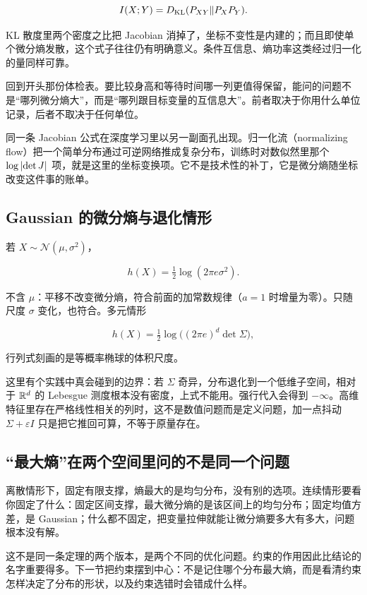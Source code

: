 \[
I(X;Y)=D_{\mathrm{KL}}(P_{XY}\Vert P_XP_Y).
\]

KL 散度里两个密度之比把 Jacobian 消掉了，坐标不变性是内建的；而且即使单个微分熵发散，这个式子往往仍有明确意义。条件互信息、熵功率这类经过归一化的量同样可靠。

回到开头那份体检表。要比较身高和等待时间哪一列更值得保留，能问的问题不是``哪列微分熵大''，而是``哪列跟目标变量的互信息大''。前者取决于你用什么单位记录，后者不取决于任何单位。

同一条 Jacobian 公式在深度学习里以另一副面孔出现。归一化流（normalizing flow）把一个简单分布通过可逆网络推成复杂分布，训练时对数似然里那个 \(\log\left|\det J\right|\) 项，就是这里的坐标变换项。它不是技术性的补丁，它是微分熵随坐标改变这件事的账单。

\subsection{Gaussian 的微分熵与退化情形}

若 \(X\sim\mathcal N(\mu,\sigma^2)\)，

\[
h(X)=\tfrac12\log(2\pi e\sigma^2).
\]

不含 \(\mu\)：平移不改变微分熵，符合前面的加常数规律（\(a=1\) 时增量为零）。只随尺度 \(\sigma\) 变化，也符合。多元情形

\[
h(X)=\tfrac12\log\bigl((2\pi e)^d\det\Sigma\bigr),
\]

行列式刻画的是等概率椭球的体积尺度。

这里有个实践中真会碰到的边界：若 \(\Sigma\) 奇异，分布退化到一个低维子空间，相对于 \(\mathbb{R}^d\) 的 Lebesgue 测度根本没有密度，上式不能用。强行代入会得到 \(-\infty\)。高维特征里存在严格线性相关的列时，这不是数值问题而是定义问题，加一点抖动 \(\Sigma+\varepsilon I\) 只是把它推回可算，不等于原量存在。

\subsection{``最大熵''在两个空间里问的不是同一个问题}

离散情形下，固定有限支撑，熵最大的是均匀分布，没有别的选项。连续情形要看你固定了什么：固定区间支撑，最大微分熵的是该区间上的均匀分布；固定均值方差，是 Gaussian；什么都不固定，把变量拉伸就能让微分熵要多大有多大，问题根本没有解。

这不是同一条定理的两个版本，是两个不同的优化问题。约束的作用因此比结论的名字重要得多。下一节把约束摆到中心：不是记住哪个分布最大熵，而是看清约束怎样决定了分布的形状，以及约束选错时会错成什么样。
